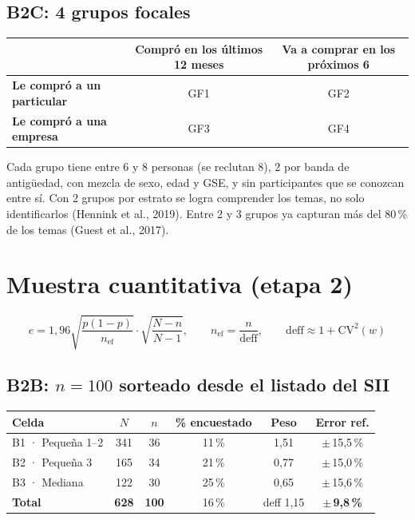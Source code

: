 \documentclass[11pt,a4paper]{article}
\begin{document}
\subsection{B2C: 4 grupos focales}
\begin{center}\small
\begin{tabularx}{\textwidth}{@{}lCC@{}}
\toprule
 & \textbf{Compró en los últimos 12 meses} & \textbf{Va a comprar en los próximos 6}\\
\midrule
\textbf{Le compró a un particular} & GF1 & GF2\\
\textbf{Le compró a una empresa} & GF3 & GF4\\
\bottomrule
\end{tabularx}
\end{center}
Cada grupo tiene entre 6 y 8 personas (se reclutan 8), 2 por banda de antigüedad, con mezcla de sexo, edad y GSE, y sin participantes que se conozcan entre sí. Con 2 grupos por estrato se logra comprender los temas, no solo identificarlos (Hennink et al., 2019). Entre 2 y 3 grupos ya capturan más del 80\,\% de los temas (Guest et al., 2017).

\section{Muestra cuantitativa (etapa 2)}

\[
e = 1{,}96\sqrt{\frac{p(1-p)}{n_{\text{ef}}}}\cdot\sqrt{\frac{N-n}{N-1}},\qquad n_{\text{ef}} = \frac{n}{\text{deff}},\qquad \text{deff}\approx 1+\text{CV}^2(w)
\]

\subsection{B2B: $n=100$ sorteado desde el listado del SII}
\begin{center}\small
\begin{tabularx}{\textwidth}{@{}lCCCCC@{}}
\toprule
\textbf{Celda} & \textbf{$N$} & \textbf{$n$} & \textbf{\% encuestado} & \textbf{Peso} & \textbf{Error ref.}\\
\midrule
B1 · Pequeña 1–2 & 341 & 36 & 11\,\% & 1,51 & $\pm$\,15,5\,\%\\
B2 · Pequeña 3 & 165 & 34 & 21\,\% & 0,77 & $\pm$\,15,0\,\%\\
B3 · Mediana & 122 & 30 & 25\,\% & 0,65 & $\pm$\,15,6\,\%\\
\midrule
\textbf{Total} & \textbf{628} & \textbf{100} & 16\,\% & deff 1,15 & $\pm$\,\textbf{9,8\,\%}\\
\bottomrule
\end{tabularx}
\end{center}
\end{document}

